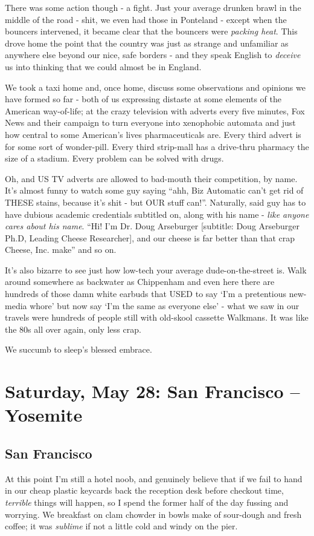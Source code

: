 \documentclass[a5paper,titlepage,11pt]{book}
\begin{document}
There was some action though - a fight.  Just your average drunken brawl in the middle of the road - shit, we even had those in Ponteland - except when the bouncers intervened, it became clear that the bouncers were \emph{packing heat}.  This drove home the point that the country was just as strange and unfamiliar as anywhere else beyond our nice, safe borders - and they speak English to \emph{deceive} us into thinking that we could almost be in England.

We took a taxi home and, once home, discuss some observations and opinions we have formed so far - both of us expressing distaste at some elements of the American way-of-life; at the crazy television with adverts every five minutes, Fox News and their campaign to turn everyone into xenophobic automata and just how central to some American's lives pharmaceuticals are.  Every third advert is for some sort of wonder-pill.  Every third strip-mall has a drive-thru pharmacy the size of a stadium.  Every problem can be solved with drugs.

Oh, and US TV adverts are allowed to bad-mouth their competition, by name.  It's almost funny to watch some guy saying ``ahh, Biz Automatic can't get rid of THESE stains, because it's shit - but OUR stuff can!''.  Naturally, said guy has to have dubious academic credentials subtitled on, along with his name - \emph{like anyone cares about his name}. ``Hi! I'm Dr. Doug Arseburger [subtitle: Doug Arseburger Ph.D, Leading Cheese Researcher], and our cheese is far better than that crap Cheese, Inc. make'' and so on.

It's also bizarre to see just how low-tech your average dude-on-the-street is.  Walk around somewhere as backwater as Chippenham and even here there are hundreds of those damn white earbuds that USED to say `I'm a pretentious new-media whore' but now say `I'm the same as everyone else' - what we saw in our travels were hundreds of people still with old-skool cassette Walkmans.  It was like the 80s all over again, only less crap.

We succumb to sleep's blessed embrace.

\chapter[San Francisco -- Yosemite]{Saturday, May 28: San Francisco -- Yosemite}
\section*{San Francisco}
At this point I'm still a hotel noob, and genuinely believe that if we fail to hand in our cheap plastic keycards back the reception desk before checkout time, \emph{terrible} things will happen, so I spend the former half of the day fussing and worrying.  We breakfast on clam chowder in bowls make of sour-dough and fresh coffee; it was \emph{sublime} if not a little cold and windy on the pier.
\end{document}
